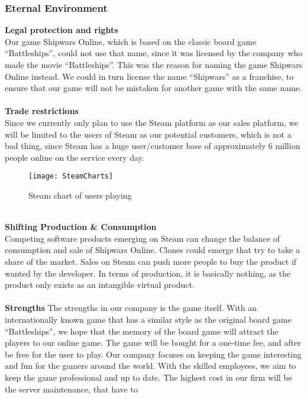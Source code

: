 	\subsubsection{Eternal Environment}
	\textbf{Legal protection and rights}
	\\
	Our game Shipwars Online, which is based on the classic board game
   “Battleships”, could not use that name, since it was licensed by the
   company who made the movie “Battleships”. This was the reason for naming
    the game Shipwars Online instead. We could in turn license the name
     “Shipwars” as a franchise, to ensure that our game will not be mistaken
      for another game with the same name.
	\\
	\\
	\textbf{Trade restrictions}
	\\
	Since we currently only plan to use the Steam platform as our sales
  platform, we will be limited to the users of Steam as our potential
  customers, which is not a bad thing, since Steam has a huge user/customer
  base of approximately 6 million people online on the service every day.
	\\
	\begin{figure}[h]
	\centerline{\texttt{[image: SteamCharts]}}
	\caption{Steam chart of users playing}
	\end{figure}
	\\
	\textbf{Shifting Production \& Consumption}
	\\
	Competing software products emerging on Steam can change the balance of
   consumption and sale of Shipwars Online. Clones could emerge that try to
    take a share of the market. Sales on Steam can push more people to buy
    the product if wanted by the developer. In terms of production, it is
    basically nothing, as the product only exists as an intangible virtual
     product.
	\\
	\\
	\textbf{Strengths}
	The strengths in our company is the game itself. With an internationally
  known game that has a similar style as the original board game
  “Battleships”, we hope that the memory of the board game will attract
  the players to our online game. The game will be bought for a one-time
   fee, and after be free for the user to play. Our company focuses on
    keeping the game interesting and fun for the gamers around the world.
     With the skilled employees, we aim to keep the game professional and
     up to date.
The highest cost in our firm will be the server maintenance, that have to
